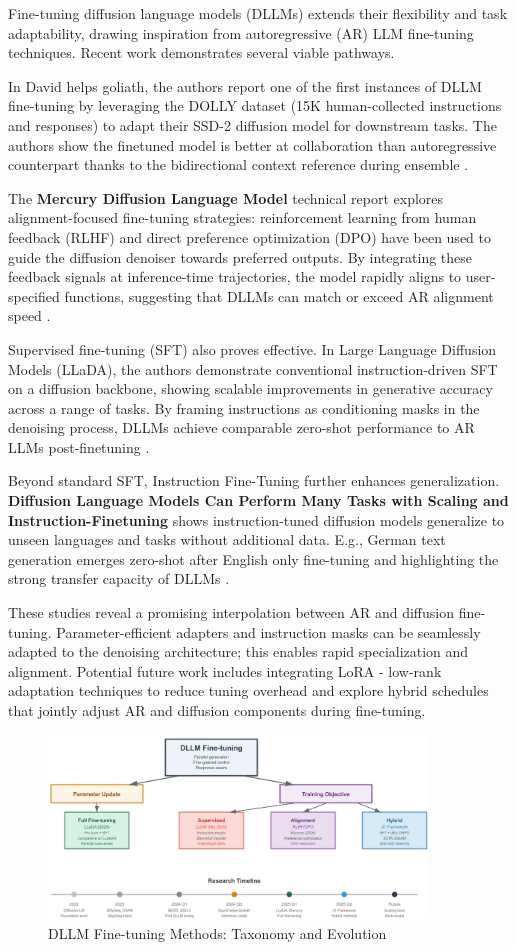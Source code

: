 Fine-tuning diffusion language models (DLLMs) extends their flexibility and task adaptability, drawing inspiration from autoregressive (AR) LLM fine-tuning techniques. Recent work demonstrates several viable pathways.

In David helps goliath, the authors report one of the first instances of DLLM fine-tuning by leveraging the DOLLY dataset (15K human-collected instructions and responses) to adapt their SSD-2 diffusion model for downstream tasks. The authors show the finetuned model is better at collaboration than autoregressive counterpart thanks to the bidirectional context reference during ensemble \cite{han_david_2024}.

The \textbf{Mercury Diffusion Language Model} technical report explores alignment-focused fine-tuning strategies: reinforcement learning from human feedback (RLHF) and direct preference optimization (DPO) have been used to guide the diffusion denoiser towards preferred outputs.  By integrating these feedback signals at inference-time trajectories, the model rapidly aligns to user-specified functions, suggesting that DLLMs can match or exceed AR alignment speed \cite{labs2025mercuryultrafastlanguagemodels}.

Supervised fine-tuning (SFT) also proves effective. In Large Language Diffusion Models (LLaDA), the authors demonstrate conventional instruction-driven SFT on a diffusion backbone, showing scalable improvements in generative accuracy across a range of tasks.  By framing instructions as conditioning masks in the denoising process, DLLMs achieve comparable zero-shot performance to AR LLMs post-finetuning \cite{nie_large_2025}.

Beyond standard SFT, Instruction Fine-Tuning further enhances generalization.  \textbf{Diffusion Language Models Can Perform Many Tasks with Scaling and Instruction-Finetuning} shows instruction-tuned diffusion models generalize to unseen languages and tasks without additional data. E.g., German text generation emerges zero-shot after English only fine-tuning and highlighting the strong transfer capacity of DLLMs \cite{ye_diffusion_2025}.

These studies reveal a promising interpolation between AR and diffusion fine-tuning. Parameter-efficient adapters and instruction masks can be seamlessly adapted to the denoising architecture; this enables rapid specialization and alignment.  Potential future work includes integrating LoRA - low-rank adaptation techniques to reduce tuning overhead and explore hybrid schedules that jointly adjust AR and diffusion components during fine-tuning.

\begin{figure}[ht]
    \centering
    \includegraphics[width=0.9\textwidth]{figs/10_finetune.pdf}
    \caption{DLLM Fine-tuning Methods: Taxonomy and Evolution}
    \label{fig:dllm_finetune}
\end{figure}

% 
% 